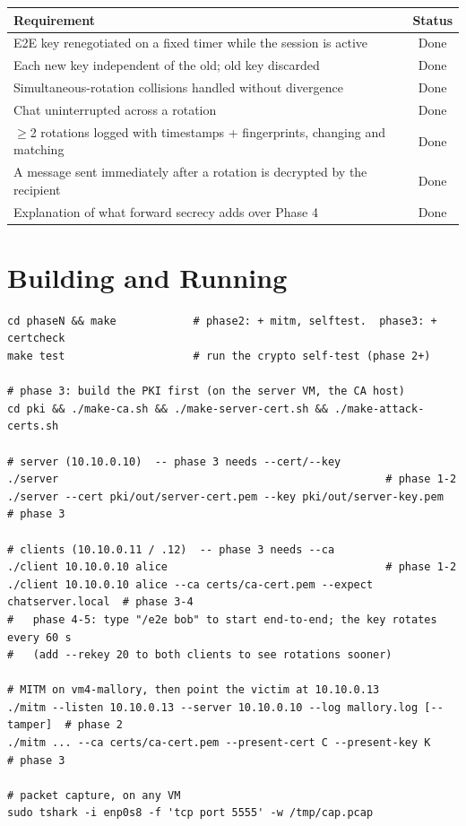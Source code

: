 \documentclass[11pt,a4paper]{article}
\begin{document}
\begin{center}
\small
\begin{tabular}{@{}lc@{}}
\toprule
\textbf{Requirement} & \textbf{Status} \\
\midrule
E2E key renegotiated on a fixed timer while the session is active & Done \\
Each new key independent of the old; old key discarded & Done \\
Simultaneous-rotation collisions handled without divergence & Done \\
Chat uninterrupted across a rotation & Done \\
$\geq$2 rotations logged with timestamps + fingerprints, changing and matching & Done \\
A message sent immediately after a rotation is decrypted by the recipient & Done \\
Explanation of what forward secrecy adds over Phase 4 & Done \\
\bottomrule
\end{tabular}
\end{center}

\section{Building and Running}

\begin{lstlisting}
cd phaseN && make            # phase2: + mitm, selftest.  phase3: + certcheck
make test                    # run the crypto self-test (phase 2+)

# phase 3: build the PKI first (on the server VM, the CA host)
cd pki && ./make-ca.sh && ./make-server-cert.sh && ./make-attack-certs.sh

# server (10.10.0.10)  -- phase 3 needs --cert/--key
./server                                                   # phase 1-2
./server --cert pki/out/server-cert.pem --key pki/out/server-key.pem   # phase 3

# clients (10.10.0.11 / .12)  -- phase 3 needs --ca
./client 10.10.0.10 alice                                  # phase 1-2
./client 10.10.0.10 alice --ca certs/ca-cert.pem --expect chatserver.local  # phase 3-4
#   phase 4-5: type "/e2e bob" to start end-to-end; the key rotates every 60 s
#   (add --rekey 20 to both clients to see rotations sooner)

# MITM on vm4-mallory, then point the victim at 10.10.0.13
./mitm --listen 10.10.0.13 --server 10.10.0.10 --log mallory.log [--tamper]  # phase 2
./mitm ... --ca certs/ca-cert.pem --present-cert C --present-key K            # phase 3

# packet capture, on any VM
sudo tshark -i enp0s8 -f 'tcp port 5555' -w /tmp/cap.pcap
\end{lstlisting}
\end{document}
